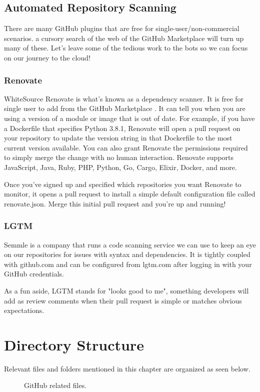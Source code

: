 \subsection{Automated Repository Scanning}

\justify
There are many GitHub plugins that are free for
single-user/non-commercial scenarios. a cursory search of the web of the
GitHub Marketplace will turn up many of these. Let's leave some of the
tedious work to the bots so we can focus on our journey to the cloud!


\subsubsection{Renovate}

WhiteSource Renovate is what's known as a dependency scanner. It is free
for single user to add from the GitHub Marketplace
. It can tell you when you are using a version of a module or image that
is out of date. For example, if you have a Dockerfile that specifies
Python 3.8.1, Renovate will open a pull request on your repository to
update the version string in that Dockerfile to the most current version
available. You can also grant Renovate the permissions required to
simply merge the change with no human interaction. Renovate supports
JavaScript, Java, Ruby, PHP, Python, Go, Cargo, Elixir, Docker, and
more.

\justify
Once you've signed up and specified which repositories you want Renovate
to monitor, it opens a pull request to install a simple default
configuration file called renovate.json. Merge this initial pull request
and you're up and running!

\subsubsection{LGTM}

Semmle is a company that runs a code scanning service we can use to keep
an eye on our repositories for issues with syntax and dependencies. It
is tightly coupled with github.com and can be configured from lgtm.com
after logging in with your GitHub credentials.

\justify
As a fun aside, LGTM stands for "looks good to me", something developers
will add as review comments when their pull request is simple or matches
obvious expectations.

\clearpage


\section{Directory Structure}

Relevant files and folders mentioned in this chapter are organized as
seen below.

\begin{figure}[!htb]
   \centering
   
   \caption{GitHub related files.}
\end{figure}

